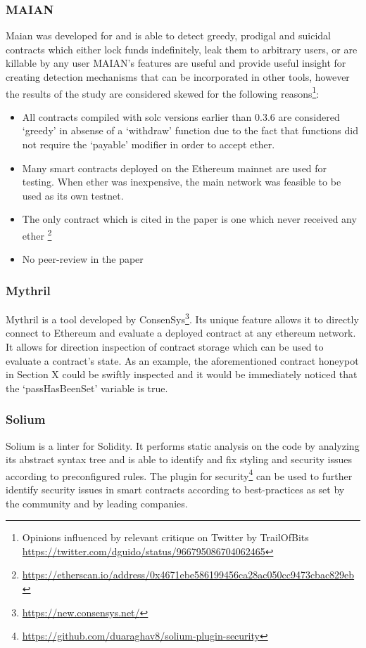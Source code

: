 \subsubsection{MAIAN}
Maian \cite{maian} was developed for \cite{greedyprodigal} and is able to detect greedy, prodigal and suicidal contracts which either lock funds indefinitely, leak them to arbitrary users, or are killable by any user %
MAIAN's features are useful and provide useful insight for creating detection mechanisms that can be incorporated in other tools, however the results of the study are considered skewed for the following reasons\footnote{Opinions influenced by relevant critique on Twitter by TrailOfBits \url{https://twitter.com/dguido/status/966795086704062465}}:
\begin{itemize}
    \item All contracts compiled with solc versions earlier than 0.3.6 are considered `greedy' in absense of a `withdraw' function due to the fact that functions did not require the `payable' modifier in order to accept ether. 
    \item Many smart contracts deployed on the Ethereum mainnet are used for testing. When ether was inexpensive, the main network was feasible to be used as its own testnet.
    \item The only contract which is cited in the paper is one which never  received any ether \footnote{\url{https://etherscan.io/address/0x4671ebe586199456ca28ac050cc9473cbac829eb}}
    \item No peer-review in the paper
\end{itemize}
\subsubsection{Mythril}
Mythril \cite{mythril} is a tool developed by ConsenSys\footnote{\url{https://new.consensys.net/}}. Its unique feature allows it to directly connect to Ethereum and evaluate a deployed contract at any ethereum network. It allows for direction inspection of contract storage which can be used to evaluate a contract's state. As an example, the aforementioned contract honeypot in Section X could be swiftly inspected and it would be immediately noticed that the `passHasBeenSet' variable is true.


\subsubsection{Solium}
Solium \cite{solium} is a linter for Solidity. It performs static analysis on the code by analyzing its abstract syntax tree and is able to identify and fix styling and security issues according to preconfigured rules. The plugin for security\footnote{\url{https://github.com/duaraghav8/solium-plugin-security}} can be used to further identify security issues in smart contracts according to best-practices as set by the community and by leading companies.

